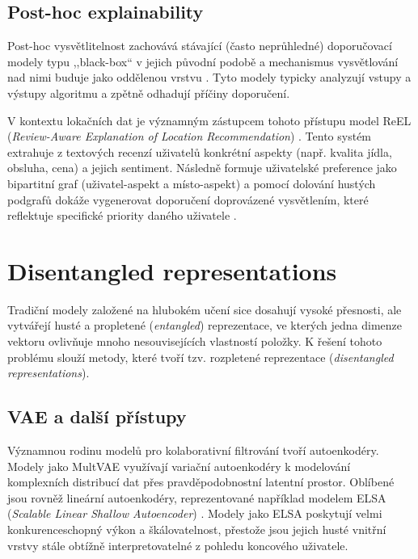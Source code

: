 \subsection{Post-hoc explainability}
Post-hoc vysvětlitelnost zachovává stávající (často neprůhledné) doporučovací modely typu ,,black-box`` v jejich původní podobě a mechanismus vysvětlování nad nimi buduje jako oddělenou vrstvu \cite{Abusitta2024}. Tyto modely typicky analyzují vstupy a výstupy algoritmu a zpětně odhadují příčiny doporučení. 

V kontextu lokačních dat je významným zástupcem tohoto přístupu model ReEL (\textit{Review-Aware Explanation of Location Recommendation}) \cite{Baral2018}. Tento systém extrahuje z textových recenzí uživatelů konkrétní aspekty (např. kvalita jídla, obsluha, cena) a jejich sentiment. Následně formuje uživatelské preference jako bipartitní graf (uživatel-aspekt a místo-aspekt) a pomocí dolování hustých podgrafů dokáže vygenerovat doporučení doprovázené vysvětlením, které reflektuje specifické priority daného uživatele \cite{Baral2018}.


\section{Disentangled representations}
\label{sec:related_disentanglement}

Tradiční modely založené na hlubokém učení sice dosahují vysoké přesnosti, ale vytvářejí husté a propletené (\textit{entangled}) reprezentace, ve kterých jedna dimenze vektoru ovlivňuje mnoho nesouvisejících vlastností položky. K řešení tohoto problému slouží metody, které tvoří tzv. rozpletené reprezentace (\textit{disentangled representations}).

\subsection{VAE a další přístupy}
Významnou rodinu modelů pro kolaborativní filtrování tvoří autoenkodéry. Modely jako MultVAE \cite{Spisak2024} využívají variační autoenkodéry k modelování komplexních distribucí dat přes pravděpodobnostní latentní prostor. Oblíbené jsou rovněž lineární autoenkodéry, reprezentované například modelem ELSA (\textit{Scalable Linear Shallow Autoencoder}) \cite{Spisak2024}. Modely jako ELSA poskytují velmi konkurenceschopný výkon a škálovatelnost, přestože jsou jejich husté vnitřní vrstvy stále obtížně interpretovatelné z pohledu koncového uživatele.

